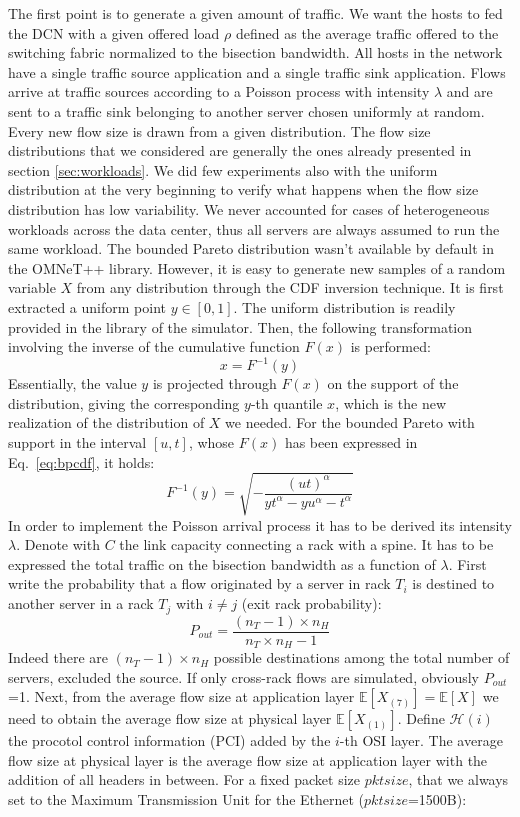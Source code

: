 The first point is to generate a given amount of traffic. We want the hosts to fed the DCN with a given offered load $\rho$ defined as the average traffic offered to the switching fabric normalized to the bisection bandwidth. All hosts in the network have a single traffic source application and a single traffic sink application. Flows arrive at traffic sources according to a Poisson process with intensity $\lambda$ and are sent to a traffic sink belonging to another server chosen uniformly at random. Every new flow size is drawn from a given distribution. The flow size distributions that we considered are generally the ones already presented in section \ref{sec:workloads}. We did few experiments also with the uniform distribution at the very beginning to verify what happens when the flow size distribution has low variability. We never accounted for cases of heterogeneous workloads across the data center, thus all servers are always assumed to run the same workload. The bounded Pareto distribution wasn't available by default in the OMNeT++ library. However, it is easy to generate new samples of a random variable $X$ from any distribution through the CDF inversion technique. It is first extracted a uniform point $y \in [0,1]$. The uniform distribution is readily provided in the library of the simulator. Then, the following transformation involving the inverse of the cumulative function $F(x)$ is performed:
\[
x = F^{-1}(y)
\]
Essentially, the value $y$ is projected through $F(x)$ on the support of the distribution, giving the corresponding $y$-th quantile $x$, which is the new realization of the distribution of $X$ we needed. For the bounded Pareto with support in the interval $[u,t]$, whose $F(x)$ has been expressed in Eq.~\ref{eq:bpcdf}, it holds:
\[
F^{-1}(y) = \sqrt{-\dfrac{(ut)^\alpha}{yt^\alpha - yu^\alpha - t^\alpha}}
\]
In order to implement the Poisson arrival process it has to be derived its intensity $\lambda$. Denote with $C$ the link capacity connecting a rack with a spine. It has to be expressed the total traffic on the bisection bandwidth as a function of $\lambda$. First write the probability that a flow originated by a server in rack $T_i$ is destined to another server in a rack $T_j$ with $i \neq j$ (exit rack probability):
\[
P_{out} = \frac{(n_T-1)\times n_H}{n_T \times n_H - 1}
\]
Indeed there are $(n_T-1)\times n_H$ possible destinations among the total number of servers, excluded the source. If only cross-rack flows are simulated, obviously $P_{out}$=1.  Next, from the average flow size at application layer $\mathbb{E}[X_{(7)}]=\mathbb{E}[X]$ we need to obtain the average flow size at physical layer $\mathbb{E}[X_{(1)}]$. Define $\mathcal{H}(i)$ the procotol control information (PCI) added by the $i$-th OSI layer. The average flow size at physical layer is the average flow size at application layer with the addition of all headers in between. For a fixed packet size $pktsize$, that we always set to the Maximum Transmission Unit for the Ethernet ($pktsize$=1500B):
